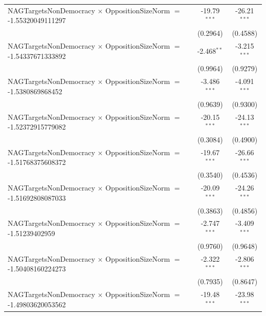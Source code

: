\begin{tabular}{lcc}
   NAGTargetsNonDemocracy $\times$ OppositionSizeNorm $=$ -1.55320049111297     & -19.79$^{***}$       & -26.21$^{***}$\\   
                                                                                & (0.2964)             & (0.4588)\\   
   NAGTargetsNonDemocracy $\times$ OppositionSizeNorm $=$ -1.54337671333892     & -2.468$^{**}$        & -3.215$^{***}$\\   
                                                                                & (0.9964)             & (0.9279)\\   
   NAGTargetsNonDemocracy $\times$ OppositionSizeNorm $=$ -1.5380869868452      & -3.486$^{***}$       & -4.091$^{***}$\\   
                                                                                & (0.9639)             & (0.9300)\\   
   NAGTargetsNonDemocracy $\times$ OppositionSizeNorm $=$ -1.52372915779082     & -20.15$^{***}$       & -24.13$^{***}$\\   
                                                                                & (0.3084)             & (0.4900)\\   
   NAGTargetsNonDemocracy $\times$ OppositionSizeNorm $=$ -1.51768375608372     & -19.67$^{***}$       & -26.66$^{***}$\\   
                                                                                & (0.3540)             & (0.4536)\\   
   NAGTargetsNonDemocracy $\times$ OppositionSizeNorm $=$ -1.51692808087033     & -20.09$^{***}$       & -24.26$^{***}$\\   
                                                                                & (0.3863)             & (0.4856)\\   
   NAGTargetsNonDemocracy $\times$ OppositionSizeNorm $=$ -1.51239402959        & -2.747$^{***}$       & -3.409$^{***}$\\   
                                                                                & (0.9760)             & (0.9648)\\   
   NAGTargetsNonDemocracy $\times$ OppositionSizeNorm $=$ -1.50408160224273     & -2.322$^{***}$       & -2.806$^{***}$\\   
                                                                                & (0.7935)             & (0.8647)\\   
   NAGTargetsNonDemocracy $\times$ OppositionSizeNorm $=$ -1.49803620053562     & -19.48$^{***}$       & -23.98$^{***}$\\   

\end{tabular}
